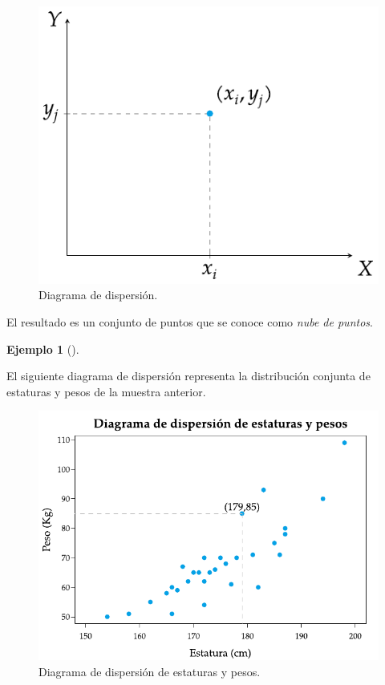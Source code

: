 \documentclass[
  a4paper,
]{scrreport}
\theoremstyle{plain}
\theoremstyle{definition}
\theoremstyle{definition}
\newtheorem{example}{Ejemplo}[chapter]
\theoremstyle{remark}
\begin{document}
\begin{figure}[H]

{\centering \includegraphics{img/regresion/diagrama_dispersion.pdf}

}

\caption{Diagrama de dispersión.}

\end{figure}%

El resultado es un conjunto de puntos que se conoce como \emph{nube de
puntos}.

\begin{example}[]\protect\hypertarget{exm-diagrama-dispersion}{}\label{exm-diagrama-dispersion}

El siguiente diagrama de dispersión representa la distribución conjunta
de estaturas y pesos de la muestra anterior.

\begin{figure}[H]

{\centering \includegraphics{img/regresion/diagrama_dispersion_estatura_peso.pdf}

}

\caption{Diagrama de dispersión de estaturas y pesos.}

\end{figure}%

\end{example}
\end{document}
